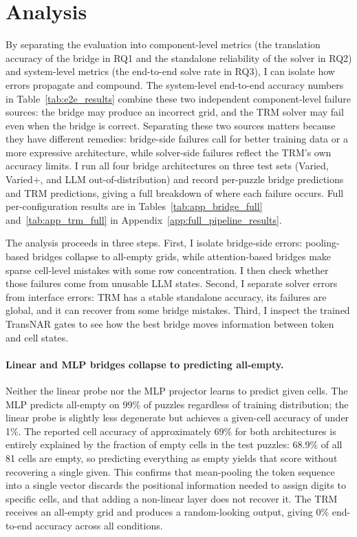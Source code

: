 \documentclass[11pt]{article}
\begin{document}
\section{Analysis}
\label{sec:analysis}
\label{sec:pipeline_error_sources}

By separating the evaluation into component-level metrics (the translation accuracy of the bridge in RQ1 and the standalone reliability of the solver in RQ2) and system-level metrics (the end-to-end solve rate in RQ3), I can isolate how errors propagate and compound. The system-level end-to-end accuracy numbers in Table~\ref{tab:e2e_results} combine these two independent component-level failure sources: the bridge may produce an incorrect grid, and the TRM solver may fail even when the bridge is correct.
Separating these two sources matters because they have different remedies: bridge-side failures call for better training data or a more expressive architecture, while solver-side failures reflect the TRM's own accuracy limits.
I run all four bridge architectures on three test sets (Varied, Varied+, and LLM out-of-distribution) and record per-puzzle bridge predictions and TRM predictions, giving a full breakdown of where each failure occurs.
Full per-configuration results are in Tables~\ref{tab:app_bridge_full} and~\ref{tab:app_trm_full} in Appendix~\ref{app:full_pipeline_results}.

The analysis proceeds in three steps.
First, I isolate bridge-side errors: pooling-based bridges collapse to all-empty grids, while attention-based bridges make sparse cell-level mistakes with some row concentration.
I then check whether those failures come from unusable LLM states.
Second, I separate solver errors from interface errors: TRM has a stable standalone accuracy, its failures are global, and it can recover from some bridge mistakes.
Third, I inspect the trained TransNAR gates to see how the best bridge moves information between token and cell states.

\paragraph{Linear and MLP bridges collapse to predicting all-empty.}
Neither the linear probe nor the MLP projector learns to predict given cells.
The MLP predicts all-empty on 99\% of puzzles regardless of training distribution; the linear probe is slightly less degenerate but achieves a given-cell accuracy of under 1\%.
The reported cell accuracy of approximately 69\% for both architectures is entirely explained by the fraction of empty cells in the test puzzles: 68.9\% of all 81 cells are empty, so predicting everything as empty yields that score without recovering a single given.
This confirms that mean-pooling the token sequence into a single vector discards the positional information needed to assign digits to specific cells, and that adding a non-linear layer does not recover it.
The TRM receives an all-empty grid and produces a random-looking output, giving 0\% end-to-end accuracy across all conditions.
\end{document}
